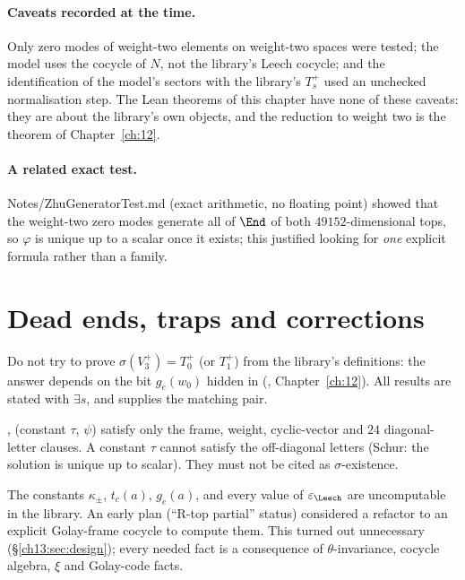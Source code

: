 \paragraph{Caveats recorded at the time.} Only zero modes of weight-two elements on weight-two spaces
were tested; the model uses the cocycle of $N$, not the library's Leech cocycle; and the identification of
the model's sectors with the library's $T_s^+$ used an unchecked normalisation step. The Lean theorems of
this chapter have none of these caveats: they are about the library's own objects, and the reduction to
weight two is the theorem of Chapter~\ref{ch:12}.

\paragraph{A related exact test.} Notes/ZhuGeneratorTest.md (exact arithmetic, no floating point) showed
that the weight-two zero modes generate all of $\End$ of both $49152$-dimensional tops, so $\varphi$ is unique
up to a scalar once it exists; this justified looking for \emph{one} explicit formula rather than a family.

\section{Dead ends, traps and corrections}\label{ch13:sec:dead}

\begin{warning}[title={Trap / dead end: ``Which $T_s^+$ is $T_0^+$'' is not well posed}]
Do not try to prove $\sigma(V_3^+)=T_0^+$ (or $T_1^+$) from the library's definitions: the answer depends on
the bit $g_e(w_0)$ hidden in  (, Chapter~\ref{ch:12}). All
results are stated with $\exists s$, and  supplies the matching pair.
\end{warning}

\begin{warning}[title={Trap / dead end: The partial theorems are not (R-top)}]
,  (constant $\tau$, $\psi$) satisfy only the frame,
weight, cyclic-vector and $24$ diagonal-letter clauses. A constant $\tau$ cannot satisfy the off-diagonal
letters (Schur: the solution is unique up to scalar). They must not be cited as $\sigma$-existence.
\end{warning}

\begin{warning}[title={Trap / dead end: Unknown constants: avoid evaluating them}]
The constants $\kappa_\pm$, $t_c(a)$, $g_e(a)$, and every value of $\varepsilon_\Leech$ are uncomputable in the library.
An early plan (``R-top partial'' status) considered a refactor to an explicit Golay-frame cocycle to compute
them. This turned out unnecessary (\S\ref{ch13:sec:design}); every needed fact is a consequence of
$\theta$-invariance, cocycle algebra, $\xi$ and Golay-code facts.
\end{warning}

